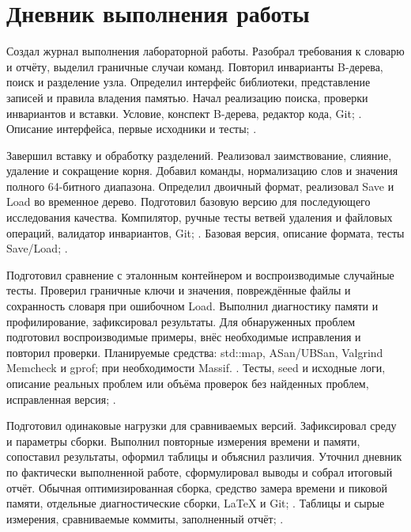\section{Дневник выполнения работы}

{Создал журнал выполнения лабораторной работы. Разобрал требования
к словарю и отчёту, выделил граничные случаи команд. Повторил инварианты
B-дерева, поиск и разделение узла. Определил интерфейс библиотеки,
представление записей и правила владения памятью. Начал реализацию
поиска, проверки инвариантов и вставки.}
{Условие, конспект B-дерева, редактор кода, Git;
.}
{Описание интерфейса, первые исходники и тесты;
.}

{Завершил вставку и обработку разделений. Реализовал заимствование,
слияние, удаление и сокращение корня. Добавил команды, нормализацию
слов и значения полного 64-битного диапазона. Определил двоичный формат,
реализовал Save и Load во временное дерево. Подготовил базовую версию
для последующего исследования качества.}
{Компилятор, ручные тесты ветвей удаления и файловых операций,
валидатор инвариантов, Git; .}
{Базовая версия, описание формата, тесты Save/Load;
.}

{Подготовил сравнение с эталонным контейнером и воспроизводимые случайные
тесты. Проверил граничные ключи и значения, повреждённые файлы
и сохранность словаря при ошибочном Load. Выполнил диагностику памяти
и профилирование, зафиксировал результаты. Для обнаруженных проблем
подготовил воспроизводимые примеры, внёс необходимые исправления
и повторил проверки.}
{Планируемые средства: std::map, ASan/UBSan, Valgrind Memcheck и gprof;
при необходимости Massif.
.}
{Тесты, seed и исходные логи, описание реальных проблем или объёма
проверок без найденных проблем, исправленная версия;
.}

{Подготовил одинаковые нагрузки для сравниваемых версий. Зафиксировал среду
и параметры сборки. Выполнил повторные измерения времени и памяти,
сопоставил результаты, оформил таблицы и объяснил различия.
Уточнил дневник по фактически выполненной работе, сформулировал
выводы и собрал итоговый отчёт.}
{Обычная оптимизированная сборка, средство замера времени и пиковой памяти,
отдельные диагностические сборки, LaTeX и Git;
.}
{Таблицы и сырые измерения, сравниваемые коммиты, заполненный отчёт;
.}
